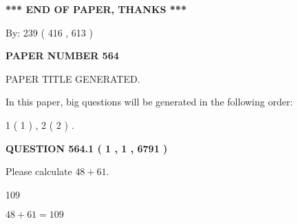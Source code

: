 \documentclass[12pt]{article}
\begin{document}
   
   
   
\vspace{1.0in} 
{\textbf{\large{ *** END OF PAPER, THANKS *** }}} 
   
   
\hspace{1.0in} By: 
 239 ( 416 ,  613 )
   
   
   
   
\newpage 
\setcounter{page}{ 
   564001 } 
   
   
   
   
 {\textbf{ \Large{ PAPER NUMBER  564  }}}
   
   
\vspace{0.2in}
   
   
   
   
   
   
   
   
 \vspace{0.2in}
 
 
 
 
   
   
 PAPER TITLE GENERATED.
   
   
   
\vspace{0.2in}
   
In this paper, big questions will be generated in the following order: 
   
   
   1 ( 1 )
 ,
   2 ( 2 )
 .
  
\vspace{0.2in}
  
{\textbf{\Large{QUESTION
564.1 
 ( 1 , 1 , 6791 )
}}}
  
  
 
Please calculate $ %
48 +  %
61 $.
 
 
 
\noindent{}
 
 

109
 
 
\noindent{}
 
 

 
 
 
\noindent{}
 
 

$ %
48 +  %
61=   %
109$
 
\end{document}
